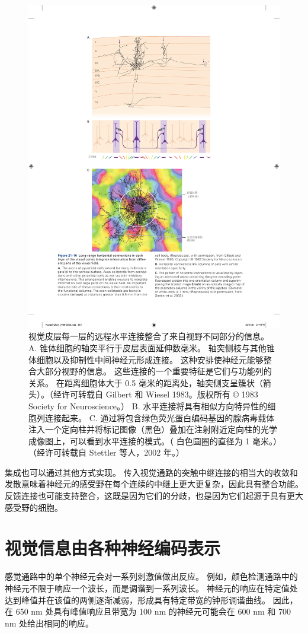 \begin{figure}[htbp]
	\centering
	\includegraphics[width=0.6\linewidth]{chap21/fig_21_16}
	\caption{视觉皮层每一层的远程水平连接整合了来自视野不同部分的信息。
		A. 锥体细胞的轴突平行于皮层表面延伸数毫米。 
		轴突侧枝与其他锥体细胞以及抑制性中间神经元形成连接。
		这种安排使神经元能够整合大部分视野的信息。
		这些连接的一个重要特征是它们与功能列的关系。
		在距离细胞体大于 0.5 毫米的距离处，轴突侧支呈簇状（箭头）。（经许可转载自 Gilbert 和 Wiesel 1983。版权所有 © 1983 Society for Neuroscience。） 
		B. 水平连接将具有相似方向特异性的细胞列连接起来。
		C. 通过将包含绿色荧光蛋白编码基因的腺病毒载体注入一个定向柱并将标记图像（黑色）叠加在注射附近定向柱的光学成像图上，可以看到水平连接的模式。（
		白色圆圈的直径为 1 毫米。）（经许可转载自 Stettler 等人，2002 年。）}
	\label{fig:21_16}
\end{figure}


集成也可以通过其他方式实现。
传入视觉通路的突触中继连接的相当大的收敛和发散意味着神经元的感受野在每个连续的中继上更大更复杂，因此具有整合功能。 
反馈连接也可能支持整合，这既是因为它们的分歧，也是因为它们起源于具有更大感受野的细胞。


\section{视觉信息由各种神经编码表示}
感觉通路中的单个神经元会对一系列刺激值做出反应。 
例如，颜色检测通路中的神经元不限于响应一个波长，而是调谐到一系列波长。 
神经元的响应在特定值处达到峰值并在该值的两侧逐渐减弱，形成具有特定带宽的钟形调谐曲线。 
因此，在 650 nm 处具有峰值响应且带宽为 100 nm 的神经元可能会在 600 nm 和 700 nm 处给出相同的响应。



